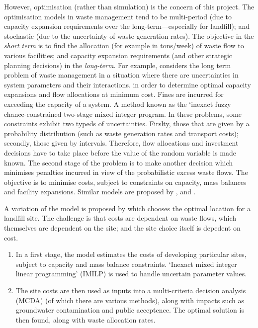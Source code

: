 However, optimisation (rather than simulation) is the concern of this project. The optimisation models in waste management tend to be multi-period (due to capacity expansion requirements over the long-term---especially for landfill); and stochastic (due to the uncertainty of waste generation rates). The objective in the \emph{short term} is to find the allocation (for example in tons/week) of waste flow to various facilities; and capacity expansion requirements (and other strategic planning decisions) in the \emph{long-term}. For example, \citet{Guo2009} considers the long term problem of waste management in a situation where there are uncertainties in system parameters and their interactions. in order to determine optimal capacity expansions and flow allocations at minimum cost. Fines are incurred for exceeding the capacity of a system. A method known as the `inexact fuzzy chance-constrained two-stage mixed integer program. In these problems, some constraints exhibit two typeds of uncertainties. Firslty, those that are given by a probability distribution (such as waste generation rates and transport costs); secondly, those given by intervals. Therefore, flow allocations and investment decisions have to take place before the value of the random variable is made known. The second stage of the problem is to make another decision which minimises penalties incurred in view of the probabilistic excess waste flows. The objective is to minimise costs, subject to constraints on capacity, mass balances and facility expansions. Similar models are proposed by \citet{Li2006}, \citet{He2009} and \citet{Xi2010}. 

A variation of the model is proposed by \citet{Cheng2003} which chooses the optimal location for a landfill site. The challenge is that costs are dependent on waste flows, which themselves are dependent on the site; and the site choice itself is depedent on cost. 
\begin{enumerate}
	\item In a first stage, the model estimates the costs of developing particular sites, subject to capacity and mass balance constraints. `Inexact mixed integer linear programming' (IMILP) is used to handle uncertain parameter values.
	\item The site costs are then used as inputs into a multi-criteria decision analysis (MCDA) (of which there are various methods), along with impacts such as groundwater contamination and public acceptence. The optimal solution is then found, along with waste allocation rates.
\end{enumerate}


